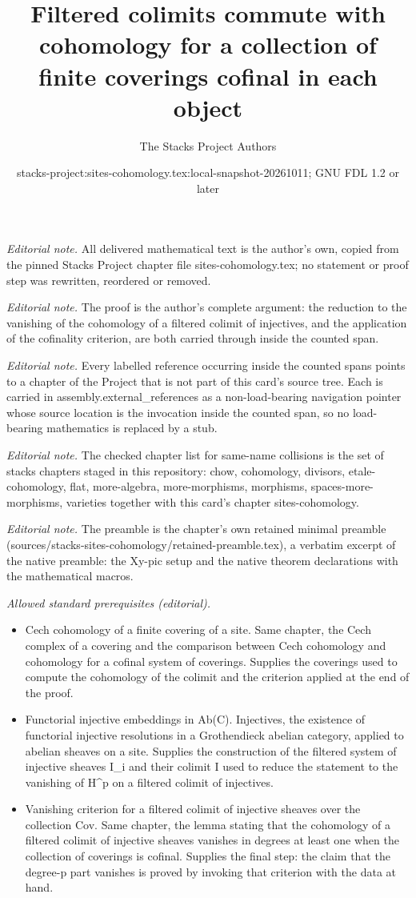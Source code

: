 \documentclass[10pt,a4paper]{amsart}
\title{Filtered colimits commute with cohomology for a collection of finite coverings cofinal in each object}
\author{The Stacks Project Authors}
\date{stacks-project:sites-cohomology.tex:local-snapshot-20261011; GNU FDL 1.2 or later}
\theoremstyle{plain}
\theoremstyle{definition}
\theoremstyle{remark}
\numberwithin{equation}{subsection}
\begin{document}
\maketitle
\noindent\textit{Editorial note.} All delivered mathematical text is the author's own, copied from the pinned Stacks Project chapter file sites-cohomology.tex; no statement or proof step was rewritten, reordered or removed.\par\medskip
\noindent\textit{Editorial note.} The proof is the author's complete argument: the reduction to the vanishing of the cohomology of a filtered colimit of injectives, and the application of the cofinality criterion, are both carried through inside the counted span.\par\medskip
\noindent\textit{Editorial note.} Every labelled reference occurring inside the counted spans points to a chapter of the Project that is not part of this card's source tree. Each is carried in assembly.external\_references as a non-load-bearing navigation pointer whose source location is the invocation inside the counted span, so no load-bearing mathematics is replaced by a stub.\par\medskip
\noindent\textit{Editorial note.} The checked chapter list for same-name collisions is the set of stacks chapters staged in this repository: chow, cohomology, divisors, etale-cohomology, flat, more-algebra, more-morphisms, morphisms, spaces-more-morphisms, varieties together with this card's chapter sites-cohomology.\par\medskip
\noindent\textit{Editorial note.} The preamble is the chapter's own retained minimal preamble (sources/stacks-sites-cohomology/retained-preamble.tex), a verbatim excerpt of the native preamble: the Xy-pic setup and the native theorem declarations with the mathematical macros.\par\medskip
\noindent\textit{Allowed standard prerequisites (editorial).}\begin{itemize}
\item Cech cohomology of a finite covering of a site. Same chapter, the Cech complex of a covering and the comparison between Cech cohomology and cohomology for a cofinal system of coverings. Supplies the coverings used to compute the cohomology of the colimit and the criterion applied at the end of the proof.
\item Functorial injective embeddings in Ab(C). Injectives, the existence of functorial injective resolutions in a Grothendieck abelian category, applied to abelian sheaves on a site. Supplies the construction of the filtered system of injective sheaves I\_i and their colimit I used to reduce the statement to the vanishing of H\textasciicircum{}p on a filtered colimit of injectives.
\item Vanishing criterion for a filtered colimit of injective sheaves over the collection Cov. Same chapter, the lemma stating that the cohomology of a filtered colimit of injective sheaves vanishes in degrees at least one when the collection of coverings is cofinal. Supplies the final step: the claim that the degree-p part vanishes is proved by invoking that criterion with the data at hand.
\end{itemize}\medskip
\end{document}
